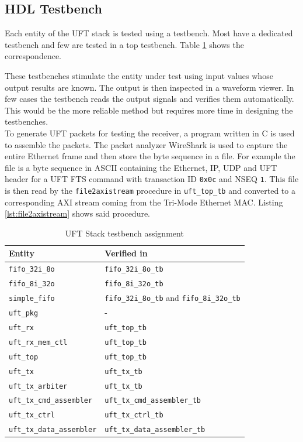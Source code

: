 \subsection{HDL Testbench}
Each entity of the UFT stack is tested using a testbench. Most have a dedicated
testbench and few are tested in a top testbench. Table \ref{tab:ufttb} shows the
correspondence.

These testbenches stimulate the entity under test using input values whose output
results are known. The output is then inspected in a waveform viewer. In few
cases the testbench reads the output signals and verifies them automatically.
This would be the more reliable method but requires more time in designing the
testbenches.
\\

To generate UFT packets for testing the receiver, a program written in C is used
to assemble the packets. The packet analyzer WireShark is used to capture the
entire Ethernet frame and then store the byte sequence in a file. For example
the file  is a byte sequence in ASCII
containing the Ethernet, IP, UDP and UFT header for a UFT FTS command with
transaction ID \texttt{0x0c} and NSEQ \texttt{1}. This file is then read by the
\texttt{file2axistream} procedure in \texttt{uft\_top\_tb} and converted to a
corresponding AXI stream coming from the Tri-Mode Ethernet MAC. Listing 
\ref{lst:file2axistream} shows said procedure.

\begin{table}[h!]
    \centering
    \begin{tabular}{l l}
        \toprule
        Entity & Verified in \\
        \midrule

        \texttt{fifo\_32i\_8o} & \texttt{fifo\_32i\_8o\_tb} \\
        \texttt{fifo\_8i\_32o} & \texttt{fifo\_8i\_32o\_tb} \\
        \texttt{simple\_fifo} & \texttt{fifo\_32i\_8o\_tb} and 
        \texttt{fifo\_8i\_32o\_tb} \\
        \texttt{uft\_pkg} & - \\
        \texttt{uft\_rx} & \texttt{uft\_top\_tb} \\
        \texttt{uft\_rx\_mem\_ctl} & \texttt{uft\_top\_tb} \\
        \texttt{uft\_top} & \texttt{uft\_top\_tb} \\
        \texttt{uft\_tx} & \texttt{uft\_tx\_tb} \\
        \texttt{uft\_tx\_arbiter} & \texttt{uft\_tx\_tb} \\
        \texttt{uft\_tx\_cmd\_assembler} & \texttt{uft\_tx\_cmd\_assembler\_tb} \\
        \texttt{uft\_tx\_ctrl} & \texttt{uft\_tx\_ctrl\_tb} \\
        \texttt{uft\_tx\_data\_assembler} & \texttt{uft\_tx\_data\_assembler\_tb} \\
        \bottomrule
    \end{tabular}
    \caption{UFT Stack testbench assignment}
    \label{tab:ufttb}
\end{table}

